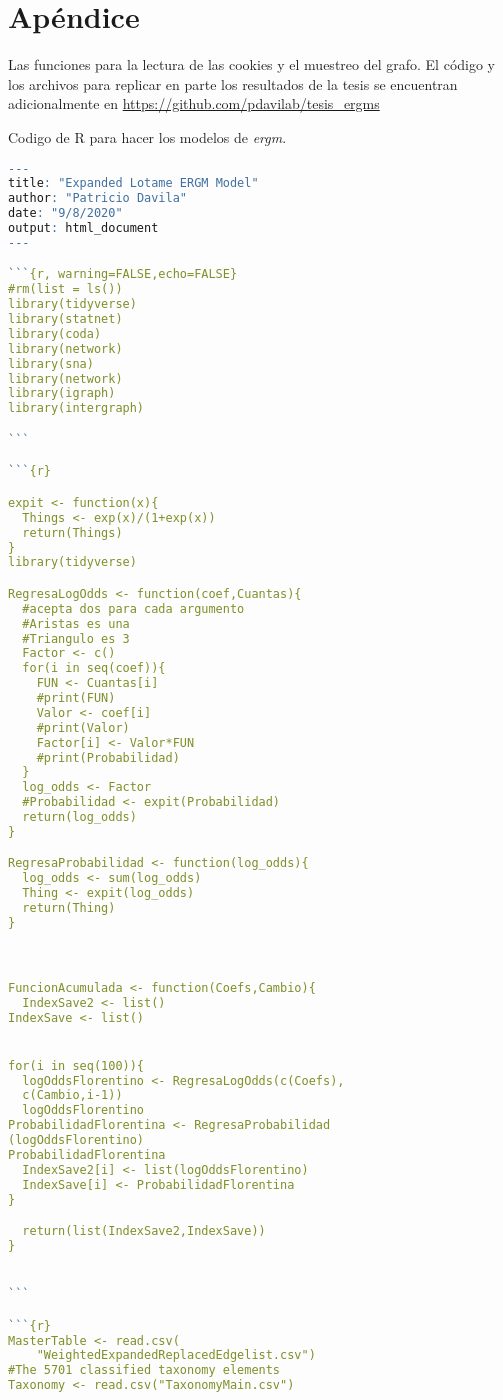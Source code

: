\chapter{Apéndice}
Las funciones para la lectura de las cookies y el muestreo del grafo. El código y los archivos para replicar en parte los resultados de la tesis se encuentran adicionalmente en \href{https://github.com/pdavilab/tesis_ergms}{https://github.com/pdavilab/tesis\_ergms}

Codigo de R para hacer los modelos de \textit{ergm}.

\begin{lstlisting}[language=R]
---
title: "Expanded Lotame ERGM Model"
author: "Patricio Davila"
date: "9/8/2020"
output: html_document
---

```{r, warning=FALSE,echo=FALSE}
#rm(list = ls())
library(tidyverse)
library(statnet)
library(coda)
library(network)
library(sna)
library(network)
library(igraph)
library(intergraph)

```

```{r}

expit <- function(x){
  Things <- exp(x)/(1+exp(x))
  return(Things)
}
library(tidyverse)

RegresaLogOdds <- function(coef,Cuantas){
  #acepta dos para cada argumento 
  #Aristas es una
  #Triangulo es 3
  Factor <- c()
  for(i in seq(coef)){
    FUN <- Cuantas[i]
    #print(FUN)
    Valor <- coef[i]
    #print(Valor)
    Factor[i] <- Valor*FUN
    #print(Probabilidad)
  }
  log_odds <- Factor
  #Probabilidad <- expit(Probabilidad)
  return(log_odds)
}

RegresaProbabilidad <- function(log_odds){
  log_odds <- sum(log_odds)
  Thing <- expit(log_odds)
  return(Thing)
}



FuncionAcumulada <- function(Coefs,Cambio){
  IndexSave2 <- list()
IndexSave <- list()


for(i in seq(100)){
  logOddsFlorentino <- RegresaLogOdds(c(Coefs),
  c(Cambio,i-1))
  logOddsFlorentino
ProbabilidadFlorentina <- RegresaProbabilidad
(logOddsFlorentino)
ProbabilidadFlorentina
  IndexSave2[i] <- list(logOddsFlorentino)
  IndexSave[i] <- ProbabilidadFlorentina
}

  return(list(IndexSave2,IndexSave))
}  


```

```{r}
MasterTable <- read.csv(
    "WeightedExpandedReplacedEdgelist.csv")
#The 5701 classified taxonomy elements
Taxonomy <- read.csv("TaxonomyMain.csv")


\end{lstlisting}
